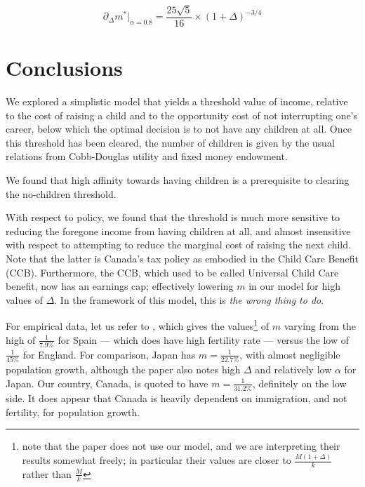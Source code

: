 \documentclass{homework}
\begin{document}
\begin{equation}
    \partial_\Delta m^* |_{\alpha = 0.8} = \frac{25\sqrt{5}}{16}\times(1+\Delta)^{-3/4}
\end{equation}

\section{Conclusions}

We explored a simplistic model that yields a threshold value of income, relative to the cost of raising a child and to the opportunity cost of not interrupting one's career, below which the optimal decision is to not have any children at all. Once this threshold has been cleared, the number of children is given by the usual relations from Cobb-Douglas utility and fixed money endowment.

We found that high affinity towards having children is a prerequisite to clearing the no-children threshold.

With respect to policy, we found that the threshold is much more sensitive to reducing the foregone income from having children at all, and almost insensitive with respect to attempting to reduce the marginal cost of raising the next child. Note that the latter is Canada's tax policy as embodied in the Child Care Benefit (CCB). Furthermore, the CCB, which used to be called Universal Child Care benefit, now has an earnings cap; effectively lowering $m$ in our model for high values of $\Delta$. In the framework of this model, this is \emph{the wrong thing to do}.

For empirical data, let us refer to \cite{paper1}, which gives the values\footnote{note that the paper does not use our model, and we are interpreting their results somewhat freely; in particular their values are closer to $\frac{M(1+\Delta)}{k}$ rather than $\frac{M}{k}$} of $m$ varying from the high of $\frac{1}{7.9\%}$ for Spain --- which does have high fertility rate --- versus the low of $\frac{1}{45\%}$ for England. For comparison, Japan has $m=\frac{1}{22.7\%}$, with almost negligible population growth, although the paper also notes high $\Delta$ and relatively low $\alpha$ for Japan.
Our country, Canada, is quoted to have $m=\frac{1}{31.2\%}$, definitely on the low side. It does appear that Canada is heavily dependent on immigration, and not fertility, for population growth.



\end{document}
